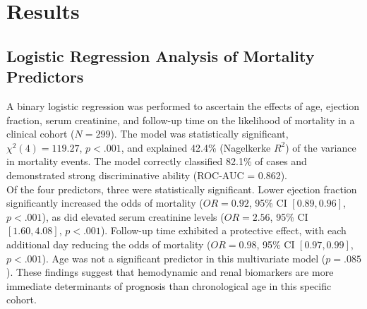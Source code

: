 \documentclass[12pt,a4paper]{article}
\begin{document}
	
	\section{Results}
	
	\subsection{Logistic Regression Analysis of Mortality Predictors}
	
	A binary logistic regression was performed to ascertain the effects of age, ejection fraction, serum creatinine, and follow-up time on the likelihood of mortality in a clinical cohort ($N = 299$). The model was statistically significant, $\chi^2(4) = 119.27$, $p < .001$, and explained 42.4\% (Nagelkerke $R^2$) of the variance in mortality events. The model correctly classified 82.1\% of cases and demonstrated strong discriminative ability (ROC-AUC = 0.862).\\
	
	\noindent Of the four predictors, three were statistically significant. Lower ejection fraction significantly increased the odds of mortality ($\mathit{OR} = 0.92$, 95\% CI $[0.89, 0.96]$, $p < .001$), as did elevated serum creatinine levels ($\mathit{OR} = 2.56$, 95\% CI $[1.60, 4.08]$, $p < .001$). Follow-up time exhibited a protective effect, with each additional day reducing the odds of mortality ($\mathit{OR} = 0.98$, 95\% CI $[0.97, 0.99]$, $p < .001$). Age was not a significant predictor in this multivariate model ($p = .085$). These findings suggest that hemodynamic and renal biomarkers are more immediate determinants of prognosis than chronological age in this specific cohort.
	
\end{document}
